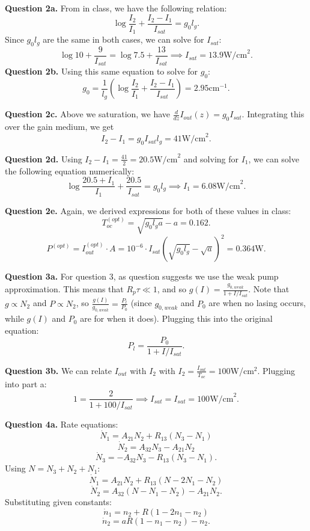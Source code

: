 \documentclass[letterpaper, reqno,11pt]{article}
\begin{document}
{\medskip\noindent\bf Question 2a.} From in class, we have the following relation:
\[
\log \frac{I_2}{I_1}+\frac{I_2-I_1}{I_{sat}}=g_0l_g
.\]
Since $g_0l_g$ are the same in both cases, we can solve for $I_{sat}$:
\[
\log 10+ \frac{9}{I_{sat}}=\log 7.5+\frac{13}{I_{sat}}\implies I_{sat}=13.9\text{W/cm}^2
.\]
{\medskip\noindent\bf Question 2b.} Using this same equation to solve for $g_0$:
\[
g_0= \frac{1}{l_g}\left( \log \frac{I_2}{I_1}+\frac{I_2-I_1}{I_{sat}} \right)=2.95\text{cm}^{-1}
.\]


{\medskip\noindent\bf Question 2c.} Above we saturation, we have $\frac{d}{dz}I_{out}(z)=g_0I_{sat}$. Integrating this over the gain medium, we get
\[
I_{2}-I_1=g_0I_{sat}l_g=41\text{W/cm}^2
.\]

{\medskip\noindent\bf Question 2d.} Using $I_2-I_1=\frac{41}{2}=20.5\text{W/cm}^2$ and solving for $I_1$, we can solve the following equation numerically:
\[
\log \frac{20.5+I_1}{I_1}+ \frac{20.5}{I_{sat}}=g_0l_g\implies I_1=6.08\text{W/cm}^2
.\]


{\medskip\noindent\bf Question 2e.} Again, we derived expressions for both of these values in class:
\[
T^{(opt)}_{oc}=\sqrt{g_0l_ga}-a=0.162
.\]
\[
P^{(opt)}=I^{(opt)}_{out}\cdot A=10^{-6}\cdot I_{sat}\left( \sqrt{g_0l_g}-\sqrt{a} \right) ^2=0.364\text{W}
.\]

{\medskip\noindent\bf Question 3a.} For question 3, as question suggests we use the weak pump approximation. This means that $R_{p}\tau\ll 1$, and so $g(I)= \frac{g_{0,weak}}{1+I/I_{sat}}$. Note that $g\propto N_2$ and $P\propto N_2$, so $\frac{g(I)}{g_{0,weak}}=\frac{P_l}{P_0}$ (since $g_{0,weak}$ and $P_0$ are when no lasing occurs, while $g(I)$ and $P_0$ are for when it does). Plugging this into the original equation:
\[
P_l=\frac{P_0}{1+I /I_{sat}}
.\]

{\medskip\noindent\bf Question 3b.} We can relate $I_{out}$ with $I_{2}$ with $I_2=\frac{I_{out}}{T_{oc}}=100$W/cm$^{2}$. Plugging into part a:
\[
1=\frac{2}{1+100 /I_{sat}}\implies I_{sat}=I_{sat}=100\text{W/cm}^2
.\]

{\medskip\noindent\bf Question 4a.} Rate equations:
\[
\dot N_1=A_{21}N_2+R_{13}\left( N_3-N_1 \right) 
\]
\[
\dot N_2=A_{32}N_3-A_{21}N_2 
\]
\[
\dot N_3=-A_{32}N_3-R_{13}\left( N_3-N_1 \right) 
.\]
Using $N=N_3+N_2+N_1$:
\[
\dot N_1=A_{21}N_2+R_{13}\left( N-2N_1-N_2 \right) 
\]
\[
\dot N_2=A_{32}(N-N_1-N_2)-A_{21}N_2 
.\]
Substituting given constants:
\[
\dot n_1=n_2+R\left( 1-2n_1-n_2 \right) 
\]
\[
\dot n_2=aR\left( 1-n_1-n_2 \right) -n_2
.\]
\end{document}
